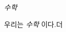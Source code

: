 \documentclass[11pt,a4paper]{article}
\begin{document}
\textit{수학}

우리는 \textit{수학} 이다.더
\end{document}
